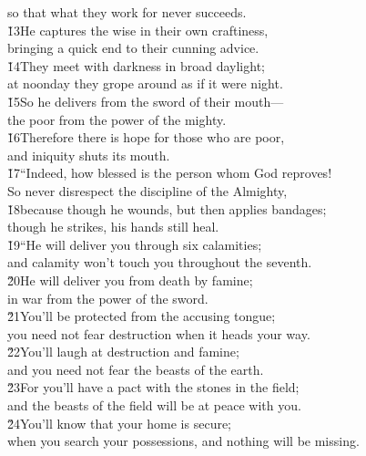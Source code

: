 \begin{poetry}
\poemll    so that what they work for never succeeds. \\
\poeml \v{13}He captures the wise in their own craftiness, \\
\poemll    bringing a quick end to their cunning advice. \\
\poeml \v{14}They meet with darkness in broad daylight; \\
\poemll    at noonday they grope around as if it were night. \\
\poeml \v{15}So he delivers from the sword of their mouth--- \\
\poemll    the poor from the power of the mighty. \\
\poeml \v{16}Therefore there is hope for those who are poor, \\
\poemll    and iniquity shuts its mouth. \\
\poeml \v{17}``Indeed, how blessed is the person whom God reproves! \\
\poemll    So never disrespect the discipline of the Almighty, \\
\poeml \v{18}because though he wounds, but then applies bandages; \\
\poemll    though he strikes, his hands still heal. \\
\poeml \v{19}``He will deliver you through six calamities; \\
\poemll    and calamity won't touch you throughout the seventh. \\
\poeml \v{20}He will deliver you from death by famine; \\
\poemll    in war from the power of the sword. \\
\poeml \v{21}You'll be protected from the accusing tongue; \\
\poemll    you need not fear destruction when it heads your way. \\
\poeml \v{22}You'll laugh at destruction and famine; \\
\poemll    and you need not fear the beasts of the earth. \\
\poeml \v{23}For you'll have a pact with the stones in the field; \\
\poemll    and the beasts of the field will be at peace with you. \\
\poeml \v{24}You'll know that your home is secure; \\
\poemll    when you search your possessions, and nothing will be missing. \\

\end{poetry}
